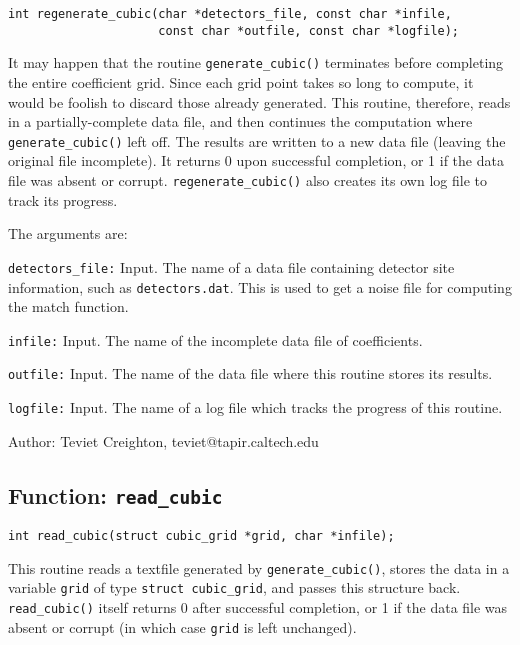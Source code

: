 \begin{verbatim}
int regenerate_cubic(char *detectors_file, const char *infile,
                     const char *outfile, const char *logfile);
\end{verbatim}
It may happen that the routine {\tt generate\_cubic()} terminates
before completing the entire coefficient grid.  Since each grid point
takes so long to compute, it would be foolish to discard those already
generated.  This routine, therefore, reads in a partially-complete
data file, and then continues the computation where {\tt
generate\_cubic()} left off.  The results are written to a new data
file (leaving the original file incomplete).  It returns 0 upon
successful completion, or 1 if the data file was absent or corrupt.
{\tt regenerate\_cubic()} also creates its own log file to track its
progress.

The arguments are:

\begin{description}
\item{\tt detectors\_file:}
  Input.  The name of a data file containing detector site
  information, such as {\tt detectors.dat}.  This is used to get a
  noise file for computing the match function.

\item{\tt infile:}
  Input.  The name of the incomplete data file of coefficients.

\item{\tt outfile:}
  Input.  The name of the data file where this routine stores its
  results.

\item{\tt logfile:}
  Input.  The name of a log file which tracks the progress of this
  routine.

\end{description}

\begin{description}
\item{Author:}
  Teviet Creighton, teviet@tapir.caltech.edu
\end{description}


\clearpage
\subsection{Function: {\tt read\_cubic}}
\label{ss:read_cubic}

\begin{verbatim}
int read_cubic(struct cubic_grid *grid, char *infile);
\end{verbatim}
This routine reads a textfile generated by {\tt generate\_cubic()},
stores the data in a variable {\tt grid} of type {\tt struct
cubic\_grid}, and passes this structure back.  {\tt read\_cubic()}
itself returns 0 after successful completion, or 1 if the data file
was absent or corrupt (in which case {\tt grid} is left unchanged).

